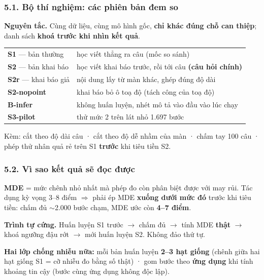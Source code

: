 \documentclass[10pt]{beamer}
\newcommand{\dn}[1]{{\color{dnteal}\textbf{#1}}}
\newcommand{\vd}[1]{{\color{vdblue}\textbf{#1}}}
\newcommand{\chred}[1]{{\color{chapred}\textbf{#1}}}
\newcommand{\ann}[1]{{\color{annmar}\textbf{#1}}}
\newcommand{\nv}[1]{{\color{daunavy}\textbf{#1}}}
\begin{document}
\begin{frame}
  \frametitle{5.1. Bộ thí nghiệm: các phiên bản đem so}
  \begin{block}{}
    \dn{Nguyên tắc.} Cùng dữ liệu, cùng mô hình gốc, \nv{chỉ khác đúng chỗ can thiệp}; danh sách \nv{khoá trước khi nhìn kết quả}.\\[1.4ex]
    \centering
    {\small
    \begin{tabular}{l l}
      \nv{S1} --- bản thường & học viết thẳng ra câu (mốc so sánh)\\[0.35ex]
      \chred{S2} --- bản khai báo & học viết khai báo trước, rồi tới câu \ann{(câu hỏi chính)}\\[0.35ex]
      \nv{S2r} --- khai báo giả & nội dung lấy từ màn khác, ghép đúng độ dài\\[0.35ex]
      \nv{S2-nopoint} & khai báo bỏ ô toạ độ (tách công của toạ độ)\\[0.35ex]
      \nv{B-infer} & không huấn luyện, nhét mô tả vào đầu vào lúc chạy\\[0.35ex]
      \nv{S3-pilot} & thử mức 2 trên lát nhỏ 1.697 bước\\
    \end{tabular}}
  \end{block}
  {\small Kèm: cắt theo độ dài câu · cắt theo độ dễ nhầm của màn · chấm tay 100 câu · phép thử nhân quả rẻ trên S1 \nv{trước} khi tiêu tiền S2.}
\end{frame}

\begin{frame}
  \frametitle{5.2. Vì sao kết quả sẽ đọc được}
  \begin{block}{}
    \dn{MDE} = mức chênh nhỏ nhất mà phép đo còn phân biệt được với may rủi. Tác dụng kỳ vọng 3--8 điểm \(\Rightarrow\) phải ép MDE \nv{xuống dưới mức đó} trước khi tiêu tiền: chấm đủ \(\sim\)2.000 bước chạm, MDE ước còn \nv{4--7 điểm}.
  \end{block}
  \begin{block}{}
    \vd{Trình tự cứng.} Huấn luyện S1 trước \(\rightarrow\) chấm đủ \(\rightarrow\) tính MDE \nv{thật} \(\rightarrow\) khoá ngưỡng đậu rớt \(\rightarrow\) mới huấn luyện S2. Không đảo thứ tự.
  \end{block}
  \vspace{0.4ex}
  \dn{Hai lớp chống nhiễu nữa:} mỗi bản huấn luyện \nv{2--3 hạt giống} (chênh giữa hai hạt giống S1 = cỡ nhiễu đo bằng số thật) · gom bước theo \nv{ứng dụng} khi tính khoảng tin cậy (bước cùng ứng dụng không độc lập).
\end{frame}
\end{document}
